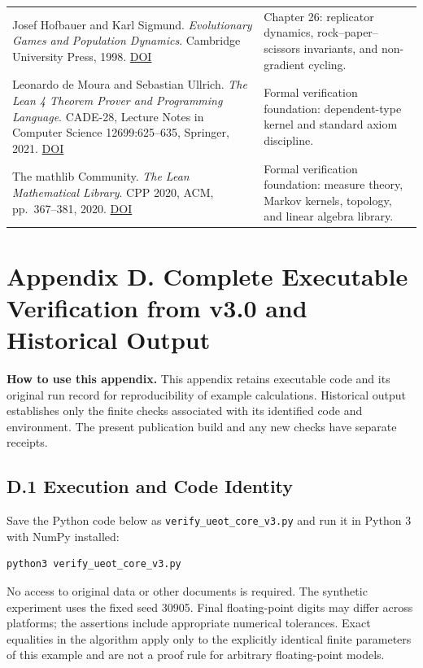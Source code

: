 \documentclass[
  english,
  11pt,
  oneside]{book}
\begin{document}
{\begin{longtable}[]{@{}
  >{\raggedright\arraybackslash}p{}
  >{\raggedright\arraybackslash}p{}@{}}
Josef Hofbauer and Karl Sigmund. \emph{Evolutionary Games and Population Dynamics}. Cambridge University Press, 1998. \href{https://doi.org/10.1017/CBO9781139173179}{DOI} & Chapter 26: replicator dynamics, rock--paper--scissors invariants, and non-gradient cycling. \\
Leonardo de Moura and Sebastian Ullrich. \emph{The Lean 4 Theorem Prover and Programming Language}. CADE-28, Lecture Notes in Computer Science 12699:625--635, Springer, 2021. \href{https://doi.org/10.1007/978-3-030-79876-5_37}{DOI} & Formal verification foundation: dependent-type kernel and standard axiom discipline. \\
The mathlib Community. \emph{The Lean Mathematical Library}. CPP 2020, ACM, pp.~367--381, 2020. \href{https://doi.org/10.1145/3372885.3373824}{DOI} & Formal verification foundation: measure theory, Markov kernels, topology, and linear algebra library. \\
\end{longtable}
}

\chapter{Appendix D. Complete Executable Verification from v3.0 and Historical Output}\label{appendix-d}

\textbf{How to use this appendix.} This appendix retains executable code and its original run record for reproducibility of example calculations. Historical output establishes only the finite checks associated with its identified code and environment. The present publication build and any new checks have separate receipts.

\section{D.1 Execution and Code Identity}\label{d.1-execution-and-code-identity}

Save the Python code below as \nolinkurl{verify_ueot_core_v3.py} and run it in Python 3 with NumPy installed:

\begin{verbatim}
python3 verify_ueot_core_v3.py
\end{verbatim}

No access to original data or other documents is required. The synthetic experiment uses the fixed seed 30905. Final floating-point digits may differ across platforms; the assertions include appropriate numerical tolerances. Exact equalities in the algorithm apply only to the explicitly identical finite parameters of this example and are not a proof rule for arbitrary floating-point models.
\end{document}
